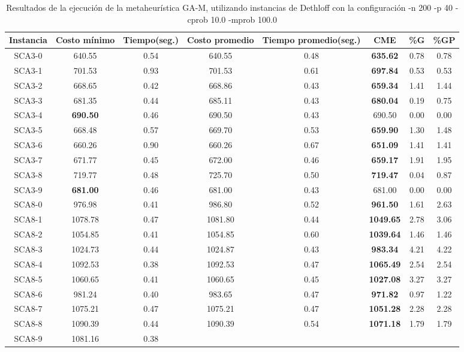 \begin{table}[ht]
\caption{Resultados de la ejecución de la metaheurística GA-M, utilizando instancias de Dethloff con la configuración -n 200 -p 40 -cprob 10.0 -mprob 100.0}
\centering
\small
\begin{tabular}{c c c c c c c c}
\hline\hline
Instancia & Costo mínimo & Tiempo(seg.) & Costo promedio & Tiempo promedio(seg.) & CME & \%G & \%GP \\ [0.5ex]
\hline
SCA3-0 & 640.55 & 0.54 & 
640.55 & 0.48 & \bf{635.62} & 
0.78 & 0.78\\SCA3-1 & 701.53 & 0.93 & 
701.53 & 0.61 & \bf{697.84} & 
0.53 & 0.53\\SCA3-2 & 668.65 & 0.42 & 
668.86 & 0.43 & \bf{659.34} & 
1.41 & 1.44\\SCA3-3 & 681.35 & 0.44 & 
685.11 & 0.43 & \bf{680.04} & 
0.19 & 0.75\\SCA3-4 & \bf{690.50} & 0.46 & 
690.50 & 0.43 & 690.50 & 0.00
 & 0.00\\
SCA3-5 & 668.48 & 0.57 & 
669.70 & 0.53 & \bf{659.90} & 
1.30 & 1.48\\SCA3-6 & 660.26 & 0.90 & 
660.26 & 0.67 & \bf{651.09} & 
1.41 & 1.41\\SCA3-7 & 671.77 & 0.45 & 
672.00 & 0.46 & \bf{659.17} & 
1.91 & 1.95\\SCA3-8 & 719.77 & 0.48 & 
725.70 & 0.50 & \bf{719.47} & 
0.04 & 0.87\\SCA3-9 & \bf{681.00} & 0.46 & 
681.00 & 0.43 & 681.00 & 0.00
 & 0.00\\
SCA8-0 & 976.98 & 0.41 & 
986.80 & 0.52 & \bf{961.50} & 
1.61 & 2.63\\SCA8-1 & 1078.78 & 0.47 & 
1081.80 & 0.44 & \bf{1049.65} & 
2.78 & 3.06\\SCA8-2 & 1054.85 & 0.41 & 
1054.85 & 0.60 & \bf{1039.64} & 
1.46 & 1.46\\SCA8-3 & 1024.73 & 0.44 & 
1024.87 & 0.43 & \bf{983.34} & 
4.21 & 4.22\\SCA8-4 & 1092.53 & 0.38 & 
1092.53 & 0.47 & \bf{1065.49} & 
2.54 & 2.54\\SCA8-5 & 1060.65 & 0.41 & 
1060.65 & 0.45 & \bf{1027.08} & 
3.27 & 3.27\\SCA8-6 & 981.24 & 0.40 & 
983.65 & 0.47 & \bf{971.82} & 
0.97 & 1.22\\SCA8-7 & 1075.21 & 0.47 & 
1075.21 & 0.47 & \bf{1051.28} & 
2.28 & 2.28\\SCA8-8 & 1090.39 & 0.44 & 
1090.39 & 0.54 & \bf{1071.18} & 
1.79 & 1.79\\SCA8-9 & 1081.16 & 0.38 & 

\end{tabular}
\end{table}
